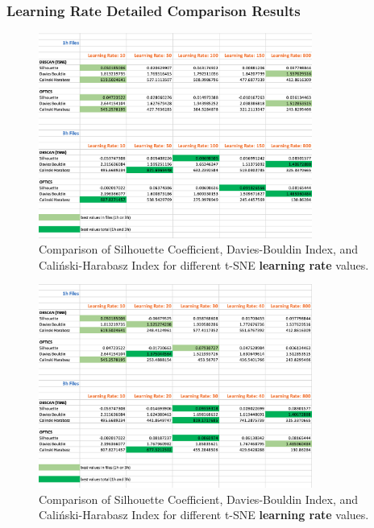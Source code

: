 \subsubsection{Learning Rate Detailed Comparison Results }
\label{appendix:comparelearningRateDetailed}

\begin{figure}
  \centering
  \includegraphics[width=0.8\textwidth]{./images/tsneParametersTest/learningRate/learningRateEvaluationScoresDetailed.png}
  \caption{Comparison of Silhouette Coefficient, Davies-Bouldin Index, and Caliński-Harabasz Index for different t-SNE \textbf{learning rate} values.}
  \label{figure:learningRateEvaluationScoresDetailed}
\end{figure}

\begin{figure}
  \centering
  \includegraphics[width=0.8\textwidth]{./images/tsneParametersTest/learningRate/learningRateEvaluationScoresDetailed2.png}
  \caption{Comparison of Silhouette Coefficient, Davies-Bouldin Index, and Caliński-Harabasz Index for different t-SNE \textbf{learning rate} values.}
  \label{figure:learningRateEvaluationScoresDetailed2}
\end{figure}


